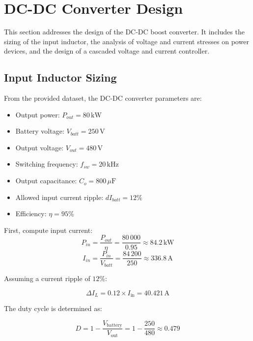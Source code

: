 \section{DC-DC Converter Design}
\label{Sect:3}

This section addresses the design of the DC-DC boost converter. It includes the sizing of the input inductor, the analysis of voltage and current stresses on power devices, and the design of a cascaded voltage and current controller.

\subsection{Input Inductor Sizing}

From the provided dataset, the DC-DC converter parameters are:

\begin{itemize}
    \item Output power: $P_{out} = 80\,\mathrm{kW}$
    \item Battery voltage: $V_{batt} = 250\,\mathrm{V}$
    \item Output voltage: $V_{out} = 480\,\mathrm{V}$
    \item Switching frequency: $f_{sw} = 20\,\mathrm{kHz}$
    \item Output capacitance: $C_o = 800\,\mu\mathrm{F}$
    \item Allowed input current ripple: $dI_{batt} = 12\%$
    \item Efficiency: $\eta = 95\%$
\end{itemize}

First, compute input current:
\begin{equation}
P_{in} = \frac{P_{out}}{\eta} = \frac{80\,000}{0.95} \approx 84.2\,\mathrm{kW}
\end{equation}
\begin{equation}
I_{in} = \frac{P_{in}}{V_{batt}} = \frac{84\,200}{250} \approx 336.8\,\mathrm{A}
\end{equation}

Assuming a current ripple of $12\%$:

\begin{equation}
    \Delta I_L = 0.12 \times I_{\text{in}} = 40.421\,\text{A}
\end{equation}

The duty cycle is determined as:

\begin{equation}
    D = 1 - \frac{V_{\text{battery}}}{V_{\text{out}}} = 1 - \frac{250}{480} \approx 0.479
\end{equation}

